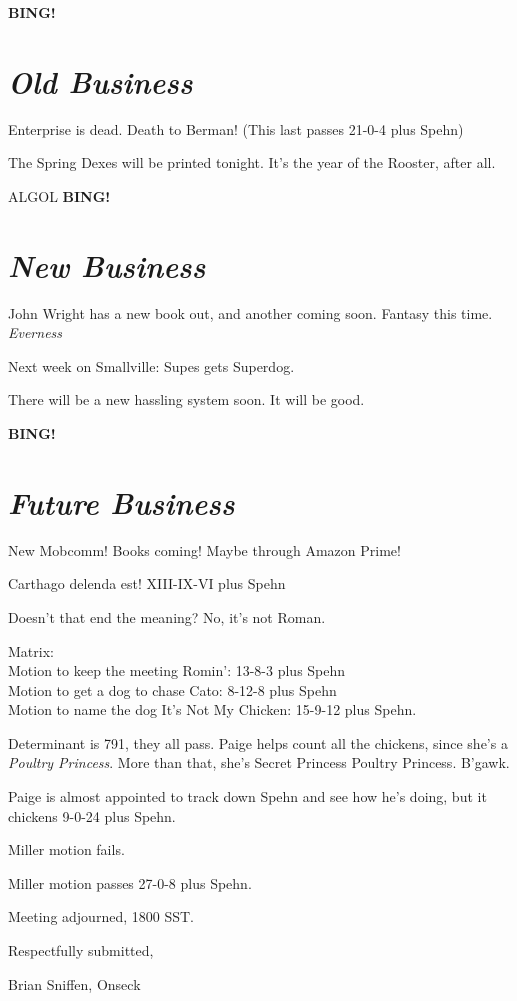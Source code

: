 \documentclass[10pt]{article}
\newcommand{\bing}{{\bf BING!} }
\newcommand{\goto}[1]{\bing \vskip 12pt \section*{{\em{#1}}}}
\newcommand{\ps}{ plus Spehn\xspace}
\begin{document}
\goto{Old Business}
Enterprise is dead.  Death to Berman! (This last passes 21-0-4\ps)

The Spring Dexes will be printed tonight.  It's the year of the
Rooster, after all.

ALGOL
\goto{New Business}

John Wright has a new book out, and another coming soon.  Fantasy this
time.  \emph{Everness}

Next week on Smallville: Supes gets Superdog.

There will be a new hassling system soon.  It will be good.

\goto{Future Business}

New Mobcomm!  Books coming!  Maybe through Amazon Prime!

Carthago delenda est!  XIII-IX-VI\ps

Doesn't that end the meaning?  No, it's not Roman.

Matrix:\\
Motion to keep the meeting Romin': 13-8-3\ps \\
Motion to get a dog to chase Cato: 8-12-8\ps \\
Motion to name the dog It's Not My Chicken: 15-9-12\ps.

Determinant is 791, they all pass.  Paige helps count all the
chickens, since she's a \emph{Poultry Princess}.  More than that,
she's Secret Princess Poultry Princess.  B'gawk.

Paige is almost appointed to track down Spehn and see how he's doing,
but it chickens 9-0-24\ps.

Miller motion fails.

Miller motion passes 27-0-8\ps.

\vspace{12pt}

\noindent
Meeting adjourned, 1800 SST.

\vspace{18pt}

\centerline{Respectfully submitted,}
\centerline{Brian Sniffen, Onseck}
\end{document}
